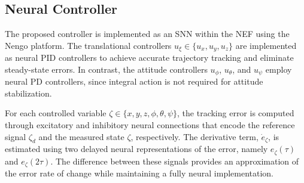 \documentclass[conference]{IEEEtran}
\begin{document}
%





\subsection{Neural Controller}



The proposed controller is implemented as an SNN within the NEF using the Nengo platform. The translational controllers $u_\xi\in\{u_x,u_y,u_z\}$ are implemented as neural PID controllers to achieve accurate trajectory tracking and eliminate steady-state errors. In contrast, the attitude controllers $u_\phi$, $u_\theta$, and $u_\psi$ employ neural PD controllers, since integral action is not required for attitude stabilization.

For each controlled variable $\zeta\in\{x,y,z,\phi,\theta,\psi\}$, the tracking error is computed through excitatory and inhibitory neural connections that encode the reference signal $\zeta_d$ and the measured state $\zeta$, respectively. The derivative term, $\dot{e}_\zeta$, is estimated using two delayed neural representations of the error, namely $e_\zeta(\tau)$ and $e_\zeta(2\tau)$. The difference between these signals provides an approximation of the error rate of change while maintaining a fully neural implementation. 
\end{document}
